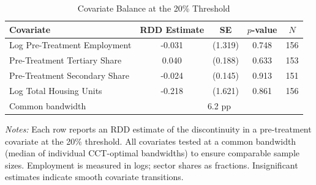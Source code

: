 \begin{table}[htbp]
\centering
\caption{Covariate Balance at the 20\% Threshold}
\label{tab:balance}
\begin{tabular}{lcccc}
\toprule
Covariate & RDD Estimate & SE & $p$-value & $N$ \\
\midrule
Log Pre-Treatment Employment & -0.031 & (1.319) & 0.748 & 156 \\
Pre-Treatment Tertiary Share & 0.040 & (0.188) & 0.633 & 153 \\
Pre-Treatment Secondary Share & -0.024 & (0.145) & 0.913 & 151 \\
Log Total Housing Units & -0.218 & (1.621) & 0.861 & 156 \\
\midrule
Common bandwidth & \multicolumn{4}{c}{6.2 pp} \\
\bottomrule
\end{tabular}
\begin{minipage}{0.90\textwidth}
\vspace{0.3em}
\footnotesize \textit{Notes:} Each row reports an RDD estimate of the discontinuity in a pre-treatment covariate at the 20\% threshold.
All covariates tested at a common bandwidth (median of individual CCT-optimal bandwidths) to ensure comparable sample sizes.
Employment is measured in logs; sector shares as fractions. Insignificant estimates indicate smooth covariate transitions.
\end{minipage}
\end{table}

